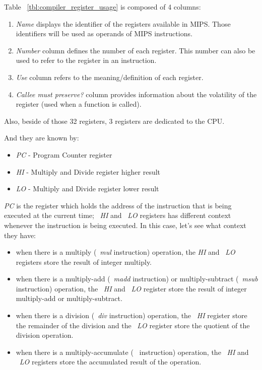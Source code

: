 \documentclass[
  oneside,
  11pt, a4paper,
  footinclude=true,
  headinclude=true,
  cleardoublepage=empty
]{scrbook}
\begin{document}
Table ~\ref{tbl:compiler_register_usage} is composed of 4 columns:

\begin{enumerate}
\item \textit{Name} displays the identifier of the registers available in MIPS. Those identifiers will be used as operands of MIPS instructions.
\item \textit{Number} column defines the number of each register. This number can also be used to refer to the register in an instruction.
\item \textit{Use} column refers to the meaning/definition of each register.
\item \textit{Callee must preserve?} column  provides information about the volatility of the register (used when a function is called).

\end{enumerate}

Also, beside of those 32 registers, 3 registers are dedicated to the CPU.

And they are known by:

\begin{itemize}

\item \textit{PC} - Program Counter register
\item \textit{HI} - Multiply and Divide register higher result
\item \textit{LO} - Multiply and Divide register lower result

\end{itemize}


\textit{PC} is the register which holds the address of the instruction that is being executed at the current time; ~\textit{HI} and ~\textit{LO} registers has different context whenever the instruction is being executed.
In this case, let's see what context they have:
\begin{itemize}
\item when there is a multiply (~\textit{mul} instruction) operation, the \textit{HI} and  ~\textit{LO}  registers store the result of integer multiply.
\item when there is a multiply-add (~\textit{madd} instruction) or multiply-subtract (~\textit{msub} instruction) operation, the ~\textit{HI} and ~\textit{LO} register store the result of integer multiply-add or multiply-subtract.
\item when there is a division (~\textit{div} instruction) operation, the ~\textit{HI} register store the remainder of the division and the ~\textit{LO} register store the quotient of the division operation.
\item when there is a multiply-accumulate (~\textit{} instruction) operation, the ~\textit{HI} and ~\textit{LO} registers store the accumulated result of the operation.
\end{itemize}
\end{document}
